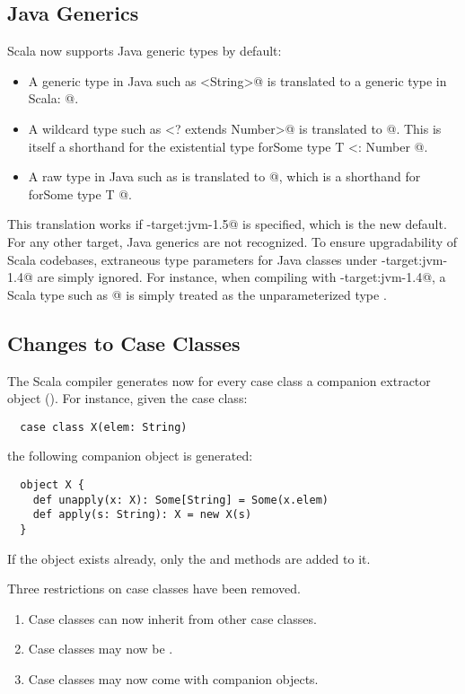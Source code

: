 \subsection*{Java Generics}

Scala now supports Java generic types by default:
\begin{itemize}
\item
A generic type in Java such as \lstinline@ArrayList<String>@ is translated to
a generic type in Scala: \lstinline@ArrayList[String]@.
\item
A wildcard type such as \lstinline@ArrayList<? extends Number>@ is translated
to \lstinline@ArrayList[_ <: Number]@. This is itself a shorthand
for the existential type \lstinline@ArrayList[T] forSome { type T <: Number }@.
\item
A raw type in Java such as \lstinline@ArrayList@ is translated to
\lstinline@ArrayList[_]@,
which is a shorthand for \lstinline@ArrayList[T] forSome { type T }@.
\end{itemize}

This translation works if \lstinline@-target:jvm-1.5@ is specified, which is
the new default. For any other target, Java generics are not
recognized. To ensure upgradability of Scala codebases, extraneous
type parameters for Java classes under \lstinline@-target:jvm-1.4@ are simply
ignored. For instance, when compiling with \lstinline@-target:jvm-1.4@, a Scala
type such as \lstinline@ArrayList[String]@ is simply treated as the
unparameterized type \lstinline@ArrayList@.

\subsection*{Changes to Case Classes}

The Scala compiler generates now for every case class a companion
extractor object ().
For instance, given the case class:
\begin{lstlisting}
  case class X(elem: String)
\end{lstlisting}
the following companion object is generated:
\begin{lstlisting}
  object X {
    def unapply(x: X): Some[String] = Some(x.elem)
    def apply(s: String): X = new X(s)
  }
\end{lstlisting}
If the object exists already, only the \lstinline@apply@ and \lstinline@unapply@ methods
are added to it.

Three restrictions on case classes have been removed.
\begin{enumerate}
\item
Case classes can now inherit from other case classes.
\item
Case classes may now be \lstinline@abstract@.
\item 
Case classes may now come with companion objects.
\end{enumerate}

